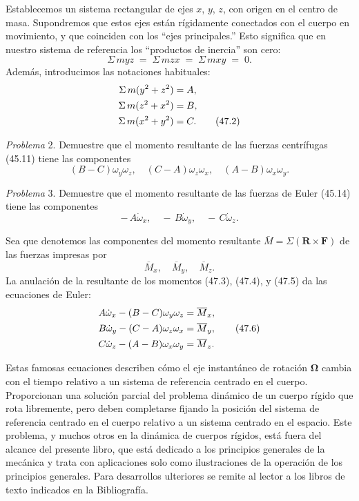 \documentclass[12pt,a4paper]{book}
\begin{document}
Establecemos un sistema rectangular de ejes $x$, $y$, $z$, con origen en el centro de masa. Supondremos que estos ejes están rígidamente conectados con el cuerpo en movimiento, y que coinciden con los ``ejes principales.'' Esto significa que en nuestro sistema de referencia los ``productos de inercia'' son cero:
\begin{equation}
\Sigma\, myz \;=\; \Sigma\, mzx \;=\; \Sigma\, mxy \;=\; 0. \tag{47.1}
\end{equation}
Además, introducimos las notaciones habituales:
\begin{align}
\Sigma\, m(y^2 + z^2) &= A, \notag\\
\Sigma\, m(z^2 + x^2) &= B, \notag\\
\Sigma\, m(x^2 + y^2) &= C. \tag{47.2}
\end{align}

\noindent\textit{Problema} 2. Demuestre que el momento resultante de las fuerzas centrífugas (45.11) tiene las componentes
\begin{equation}
(B - C)\omega_y\omega_z,\quad (C - A)\omega_z\omega_x,\quad (A - B)\omega_x\omega_y. \tag{47.3}
\end{equation}

\noindent\textit{Problema} 3. Demuestre que el momento resultante de las fuerzas de Euler (45.14) tiene las componentes
\begin{equation}
-\,A\dot{\omega}_x,\quad -\,B\dot{\omega}_y,\quad -\,C\dot{\omega}_z. \tag{47.4}
\end{equation}

Sea que denotemos las componentes del momento resultante $\bar{M} = \Sigma(\mathbf{R} \times \mathbf{F})$ de las fuerzas impresas por
\begin{equation}
\overline{M}_x,\quad \overline{M}_y,\quad \overline{M}_z. \tag{47.5}
\end{equation}
La anulación de la resultante de los momentos (47.3), (47.4), y (47.5) da las ecuaciones de Euler:
\begin{align}
A\dot{\omega}_x - (B - C)\omega_y\omega_z &= \overline{M}_x, \notag\\
B\dot{\omega}_y - (C - A)\omega_z\omega_x &= \overline{M}_y, \tag{47.6}\\
C\dot{\omega}_z - (A - B)\omega_x\omega_y &= \overline{M}_z. \notag
\end{align}

Estas famosas ecuaciones describen cómo el eje instantáneo de rotación $\mathbf{\Omega}$ cambia con el tiempo relativo a un sistema de referencia centrado en el cuerpo. Proporcionan una solución parcial del problema dinámico de un cuerpo rígido que rota libremente, pero deben completarse fijando la posición del sistema de referencia centrado en el cuerpo relativo a un sistema centrado en el espacio. Este problema, y muchos otros en la dinámica de cuerpos rígidos, está fuera del alcance del presente libro, que está dedicado a los principios generales de la mecánica y trata con aplicaciones solo como ilustraciones de la operación de los principios generales. Para desarrollos ulteriores se remite al lector a los libros de texto indicados en la Bibliografía.
\end{document}
